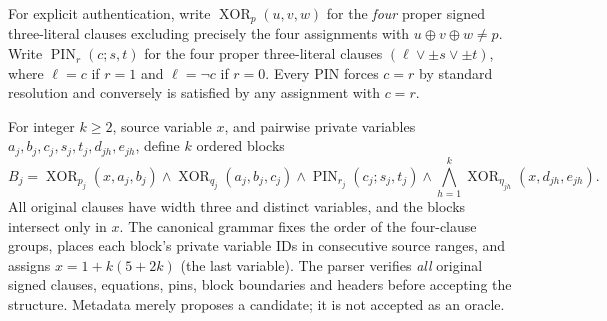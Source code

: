 \documentclass[11pt]{article}
\begin{document}
For explicit authentication, write $\operatorname{XOR}_p(u,v,w)$ for the \emph{four} proper signed three-literal clauses excluding precisely the four assignments with $u\oplus v\oplus w\ne p$. Write $\operatorname{PIN}_r(c;s,t)$ for the four proper three-literal clauses $(\ell\vee\pm s\vee\pm t)$, where $\ell=c$ if $r=1$ and $\ell=\neg c$ if $r=0$. Every PIN forces $c=r$ by standard resolution and conversely is satisfied by any assignment with $c=r$.

For integer $k\ge2$, source variable $x$, and pairwise private variables $a_j,b_j,c_j,s_j,t_j,d_{jh},e_{jh}$, define $k$ ordered blocks
\[
 B_j=\operatorname{XOR}_{p_j}(x,a_j,b_j)\wedge
      \operatorname{XOR}_{q_j}(a_j,b_j,c_j)\wedge
      \operatorname{PIN}_{r_j}(c_j;s_j,t_j)\wedge
      \bigwedge_{h=1}^{k}\operatorname{XOR}_{\eta_{jh}}(x,d_{jh},e_{jh}).
\]
All original clauses have width three and distinct variables, and the blocks intersect only in $x$. The canonical grammar fixes the order of the four-clause groups, places each block's private variable IDs in consecutive source ranges, and assigns $x=1+k(5+2k)$ (the last variable). The parser verifies \emph{all} original signed clauses, equations, pins, block boundaries and headers before accepting the structure. Metadata merely proposes a candidate; it is not accepted as an oracle.
\end{document}
